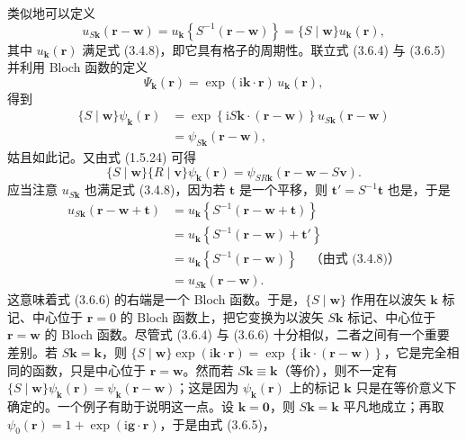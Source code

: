 类似地可以定义
\begin{equation*}
u_{S\mathbf{k}}(\mathbf{r} - \mathbf{w}) = u_{\mathbf{k}}\left\{S^{-1}(\mathbf{r} - \mathbf{w})\right\} = \{S \mid \mathbf{w}\}u_{\mathbf{k}}(\mathbf{r}),
\tag{3.6.5}
\end{equation*}
其中 $u_{\mathbf{k}}(\mathbf{r})$ 满足式 (3.4.8)，即它具有格子的周期性。联立式 (3.6.4) 与 (3.6.5) 并利用 Bloch 函数的定义
\begin{equation*}
\Psi_{\mathbf{k}}(\mathbf{r}) = \exp(\mathrm{i}\mathbf{k} \cdot \mathbf{r})\,u_{\mathbf{k}}(\mathbf{r}),
\tag{3.4.7}
\end{equation*}
得到
\begin{equation*}
\begin{aligned}
\{S \mid \mathbf{w}\}\psi_{\mathbf{k}}(\mathbf{r}) &= \exp\left\{\mathrm{i}S\mathbf{k} \cdot (\mathbf{r} - \mathbf{w})\right\}u_{S\mathbf{k}}(\mathbf{r} - \mathbf{w})\\
&= \psi_{S\mathbf{k}}(\mathbf{r} - \mathbf{w}),
\end{aligned}
\tag{3.6.6}
\end{equation*}
姑且如此记。又由式 (1.5.24) 可得
\begin{equation*}
\{S \mid \mathbf{w}\}\{R \mid \mathbf{v}\}\psi_{\mathbf{k}}(\mathbf{r}) = \psi_{SR\mathbf{k}}(\mathbf{r} - \mathbf{w} - S\mathbf{v}).
\tag{3.6.7}
\end{equation*}
应当注意 $u_{S\mathbf{k}}$ 也满足式 (3.4.8)，因为若 $\mathbf{t}$ 是一个平移，则 $\mathbf{t}' = S^{-1}\mathbf{t}$ 也是，于是
\begin{equation*}
\begin{aligned}
u_{S\mathbf{k}}(\mathbf{r} - \mathbf{w} + \mathbf{t}) &= u_{\mathbf{k}}\left\{S^{-1}(\mathbf{r} - \mathbf{w} + \mathbf{t})\right\}\\
&= u_{\mathbf{k}}\left\{S^{-1}(\mathbf{r} - \mathbf{w}) + \mathbf{t}'\right\}\\
&= u_{\mathbf{k}}\left\{S^{-1}(\mathbf{r} - \mathbf{w})\right\}\quad\text{（由式 (3.4.8)）}\\
&= u_{S\mathbf{k}}(\mathbf{r} - \mathbf{w}).
\end{aligned}
\tag{3.6.8}
\end{equation*}
这意味着式 (3.6.6) 的右端是一个 Bloch 函数。于是，$\{S \mid \mathbf{w}\}$ 作用在以波矢 $\mathbf{k}$ 标记、中心位于 $\mathbf{r} = 0$ 的 Bloch 函数上，把它变换为以波矢 $S\mathbf{k}$ 标记、中心位于 $\mathbf{r} = \mathbf{w}$ 的 Bloch 函数。尽管式 (3.6.4) 与 (3.6.6) 十分相似，二者之间有一个重要差别。若 $S\mathbf{k} = \mathbf{k}$，则 $\{S \mid \mathbf{w}\}\exp(\mathrm{i}\mathbf{k} \cdot \mathbf{r}) = \exp\left\{\mathrm{i}\mathbf{k} \cdot (\mathbf{r} - \mathbf{w})\right\}$，它是完全相同的函数，只是中心位于 $\mathbf{r} = \mathbf{w}$。然而若 $S\mathbf{k} \equiv \mathbf{k}$（等价），则不一定有 $\{S \mid \mathbf{w}\}\psi_{\mathbf{k}}(\mathbf{r}) = \psi_{\mathbf{k}}(\mathbf{r} - \mathbf{w})$；这是因为 $\psi_{\mathbf{k}}(\mathbf{r})$ 上的标记 $\mathbf{k}$ 只是在等价意义下确定的。一个例子有助于说明这一点。设 $\mathbf{k} = \mathbf{0}$，则 $S\mathbf{k} = \mathbf{k}$ 平凡地成立；再取 $\psi_{0}(\mathbf{r}) = 1 + \exp(\mathrm{i}\mathbf{g} \cdot \mathbf{r})$，于是由式 (3.6.5)，

